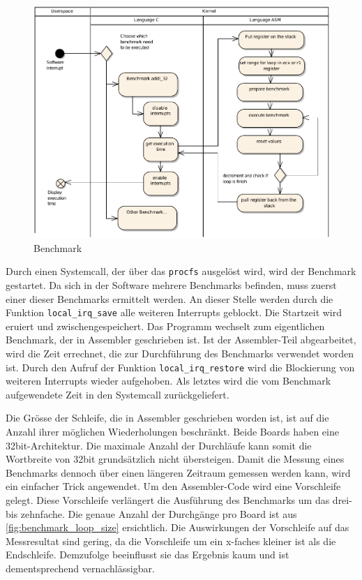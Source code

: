 \begin{figure}[H]
\centering
\includegraphics[width=1.0\textwidth]{images/benchmark_ea.pdf}
\caption{Benchmark}
\label{fig:Benchmark}
\end{figure}


Durch einen Systemcall, der über das \texttt{procfs} ausgelöst wird, wird der Benchmark gestartet. Da sich in der Software mehrere Benchmarks befinden, muss zuerst einer dieser Benchmarks ermittelt werden. An dieser Stelle werden durch die Funktion \texttt{local\_irq\_save} alle weiteren Interrupts geblockt. Die Startzeit wird eruiert und zwischengespeichert. Das Programm wechselt zum eigentlichen Benchmark, der in Assembler geschrieben ist. Ist der Assembler-Teil abgearbeitet, wird die Zeit errechnet, die zur Durchführung des Benchmarks verwendet worden ist. Durch den Aufruf der Funktion \texttt{local\_irq\_restore} wird die Blockierung von weiteren Interrupts wieder aufgehoben. Als letztes wird die vom Benchmark aufgewendete Zeit in den Systemcall zurückgeliefert.
\par
Die Grösse der Schleife, die in Assembler geschrieben worden ist, ist auf die Anzahl ihrer möglichen Wiederholungen beschränkt. Beide Boards haben eine 32bit-Architektur. Die maximale Anzahl der Durchläufe kann somit die Wortbreite von 32bit grundsätzlich nicht übersteigen. Damit die Messung eines Benchmarks dennoch über einen längeren Zeitraum gemessen werden kann, wird ein einfacher Trick angewendet. Um den Assembler-Code wird eine Vorschleife gelegt. Diese Vorschleife verlängert die Ausführung des Benchmarks um das drei- bis zehnfache. Die genaue Anzahl der Durchgänge pro Board ist aus \autoref{fig:benchmark_loop_size} ersichtlich. Die Auswirkungen der Vorschleife auf das Messresultat sind gering, da die Vorschleife um ein x-faches kleiner ist als die Endschleife. Demzufolge beeinflusst sie das Ergebnis kaum und ist dementsprechend vernachlässigbar.

